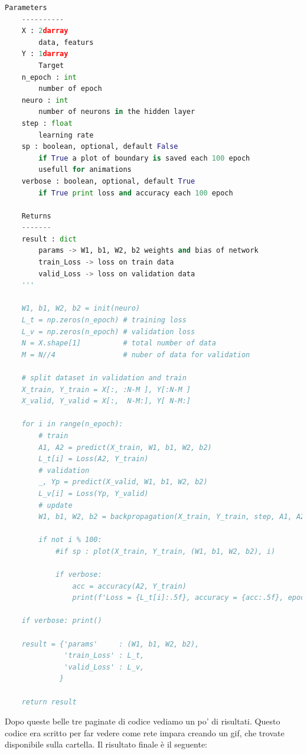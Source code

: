 \documentclass[10pt,a4paper]{article}
\begin{document}
\begin{lstlisting}[language=Python]
    Parameters
    ----------
    X : 2darray
        data, featurs
    Y : 1darray
        Target
    n_epoch : int
        number of epoch
    neuro : int
        number of neurons in the hidden layer
    step : float
        learning rate
    sp : boolean, optional, default False
        if True a plot of boundary is saved each 100 epoch
        usefull for animations 
    verbose : boolean, optional, default True
        if True print loss and accuracy each 100 epoch
    
    Returns
    -------
    result : dict
        params -> W1, b1, W2, b2 weights and bias of network
        train_Loss -> loss on train data
        valid_Loss -> loss on validation data
    '''

    W1, b1, W2, b2 = init(neuro)
    L_t = np.zeros(n_epoch) # training loss
    L_v = np.zeros(n_epoch) # validation loss
    N = X.shape[1]          # total number of data
    M = N//4                # nuber of data for validation
     
    # split dataset in validation and train 
    X_train, Y_train = X[:, :N-M ], Y[:N-M ] 
    X_valid, Y_valid = X[:,  N-M:], Y[ N-M:]
    
    for i in range(n_epoch):
        # train
        A1, A2 = predict(X_train, W1, b1, W2, b2)
        L_t[i] = Loss(A2, Y_train)
        # validation
        _, Yp = predict(X_valid, W1, b1, W2, b2)
        L_v[i] = Loss(Yp, Y_valid)
        # update
        W1, b1, W2, b2 = backpropagation(X_train, Y_train, step, A1, A2, W1, b1, W2, b2)
              
        if not i % 100:
            #if sp : plot(X_train, Y_train, (W1, b1, W2, b2), i)
            
            if verbose:
                acc = accuracy(A2, Y_train)
                print(f'Loss = {L_t[i]:.5f}, accuracy = {acc:.5f}, epoch = {i} \r', end='')
            
    if verbose: print()
    
    result = {'params'     : (W1, b1, W2, b2),
              'train_Loss' : L_t,
              'valid_Loss' : L_v,
             }
        
    return result
\end{lstlisting}
Dopo queste belle tre paginate di codice vediamo un po' di risultati. Questo codice era scritto per far vedere come rete impara creando un gif, che trovate disponibile sulla cartella. Il risultato finale è il seguente:
\FloatBarrier
\end{document}
